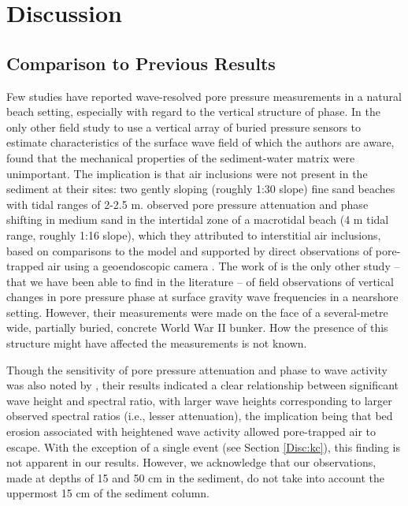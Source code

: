 \section{Discussion}\label{ch1:Discussion}

\subsection{Comparison to Previous Results}\label{Disc:Comparison}

Few studies have reported wave-resolved pore pressure measurements in a natural beach setting, especially with regard to the vertical structure of phase. In the only other field study to use a vertical array of buried pressure sensors to estimate characteristics of the surface wave field of which the authors are aware, \citet{Raubenheimer_etal1998} found that the mechanical properties of the sediment-water matrix were unimportant. The implication is that air inclusions were not present in the sediment at their sites: two gently sloping (roughly 1:30 slope) fine sand beaches with tidal ranges of 2-2.5 m. \citet{Michallet_etal2009} \citep[see also][]{Bonjean_etal2004, Mory_etal2007} observed pore pressure attenuation and phase shifting in medium sand in the intertidal zone of a macrotidal beach (4 m tidal range, roughly 1:16 slope), which they attributed to interstitial air inclusions, based on comparisons to the \citet{Sakai_etal1992} model and supported by direct observations of pore-trapped air using a geoendoscopic camera \citep[described by][]{Breul_Gourves2008}. The work of \citet{Michallet_etal2009} is the only other study -- that we have been able to find in the literature -- of field observations of vertical changes in pore pressure phase at surface gravity wave frequencies in a nearshore setting. However, their measurements were made on the face of a several-metre wide, partially buried, concrete World War II bunker. How the presence of this structure might have affected the measurements is not known.

Though the sensitivity of pore pressure attenuation and phase to wave activity was also noted by \citet{Michallet_etal2009}, their results indicated a clear relationship between significant wave height and spectral ratio, with larger wave heights corresponding to larger observed spectral ratios (i.e., lesser attenuation), the implication being that bed erosion associated with heightened wave activity allowed pore-trapped air to escape. With the exception of a single event (see Section \ref{Disc:kc}), this finding is not apparent in our results. However, we acknowledge that our observations, made at depths of 15 and 50 cm in the sediment, do not take into account the uppermost 15 cm of the sediment column.

